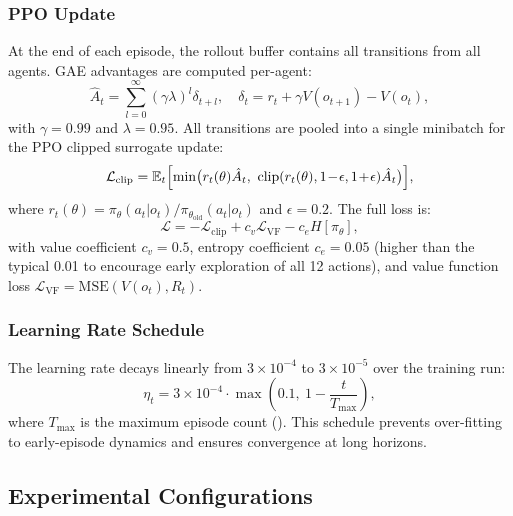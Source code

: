 \subsubsection{PPO Update}
At the end of each episode, the rollout buffer contains all transitions from
all agents.  GAE advantages are computed per-agent:
\begin{equation}
  \hat{A}_t = \sum_{l=0}^{\infty}(\gamma\lambda)^l \delta_{t+l},\quad
  \delta_t = r_t + \gamma V(o_{t+1}) - V(o_t),
  \label{eq:gae}
\end{equation}
with $\gamma = 0.99$ and $\lambda = 0.95$.  All transitions are pooled into
a single minibatch for the PPO clipped surrogate update:
\begin{equation}
  \mathcal{L}_{\text{clip}} = \mathbb{E}_t\Bigl[
    \min\bigl(r_t(\theta)\hat{A}_t,\
    \text{clip}(r_t(\theta), 1\!-\!\epsilon, 1\!+\!\epsilon)\hat{A}_t\bigr)
  \Bigr],
  \label{eq:ppo_clip}
\end{equation}
where $r_t(\theta) = \pi_\theta(a_t|o_t)/\pi_{\theta_{\text{old}}}(a_t|o_t)$
and $\epsilon = 0.2$.  The full loss is:
\begin{equation}
  \mathcal{L} = -\mathcal{L}_{\text{clip}} + c_v \mathcal{L}_{\text{VF}} - c_e H[\pi_\theta],
  \label{eq:full_loss}
\end{equation}
with value coefficient $c_v = 0.5$, entropy coefficient $c_e = 0.05$ (higher
than the typical 0.01 to encourage early exploration of all 12 actions), and
value function loss $\mathcal{L}_{\text{VF}} = \text{MSE}(V(o_t), R_t)$.

\subsubsection{Learning Rate Schedule}
The learning rate decays linearly from $3\times10^{-4}$ to $3\times10^{-5}$
over the training run:
\begin{equation}
  \eta_t = 3\times10^{-4} \cdot \max\!\left(0.1,\ 1 - \frac{t}{T_{\max}}\right),
  \label{eq:lr_schedule}
\end{equation}
where $T_{\max}$ is the maximum episode count ().
This schedule prevents over-fitting to early-episode dynamics and ensures
convergence at long horizons.

\subsection{Experimental Configurations}
\label{sec:configs}

